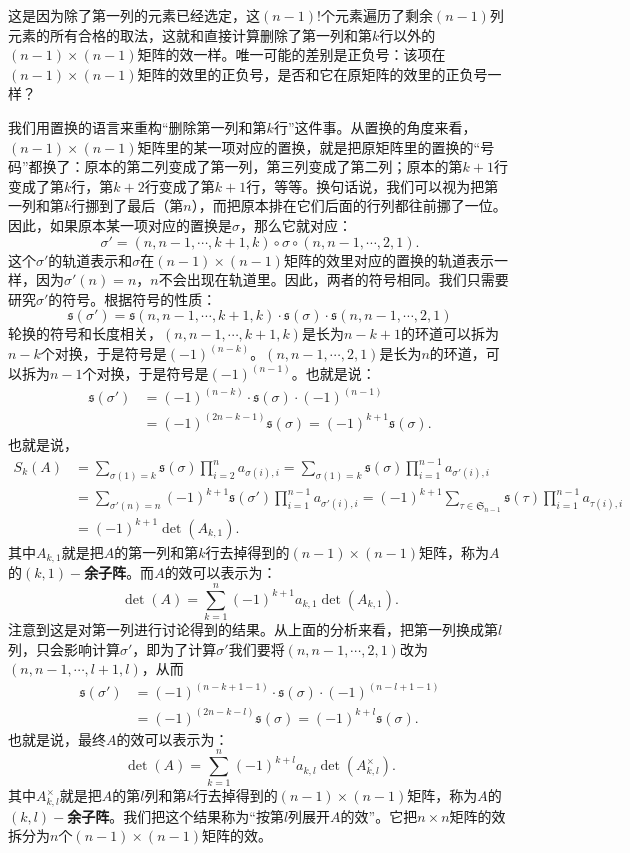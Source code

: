 \documentclass[12pt,UTF8]{ctexbook}
\begin{document}
这是因为除了第一列的元素已经选定，这$(n-1)!$个元素遍历了剩余$(n-1)$列元素的所有合格的取法，这就和直接计算删除了第一列和第$k$行以外的$(n-1)\times (n-1)$矩阵的效一样。唯一可能的差别是正负号：该项在$(n-1)\times (n-1)$矩阵的效里的正负号，是否和它在原矩阵的效里的正负号一样？

我们用置换的语言来重构“删除第一列和第$k$行”这件事。从置换的角度来看，$(n-1)\times (n-1)$矩阵里的某一项对应的置换，就是把原矩阵里的置换的“号码”都换了：原本的第二列变成了第一列，第三列变成了第二列；原本的第$k+1$行变成了第$k$行，第$k+2$行变成了第$k+1$行，等等。换句话说，我们可以视为把第一列和第$k$行挪到了最后（第$n$），而把原本排在它们后面的行列都往前挪了一位。因此，如果原本某一项对应的置换是$\sigma$，那么它就对应：
$$
\sigma' = (n,n-1,\cdots,k+1,k)\circ\sigma \circ(n,n-1,\cdots, 2,1).
$$
这个$\sigma'$的轨道表示和$\sigma$在$(n-1)\times (n-1)$矩阵的效里对应的置换的轨道表示一样，因为$\sigma'(n)=n$，$n$不会出现在轨道里。因此，两者的符号相同。我们只需要研究$\sigma'$的符号。根据符号的性质：
$$
\mathfrak{s} (\sigma') = \mathfrak{s}(n,n-1,\cdots,k+1,k)\cdot \mathfrak{s}(\sigma)\cdot \mathfrak{s}(n,n-1,\cdots, 2,1)
$$
轮换的符号和长度相关，$(n,n-1,\cdots,k+1,k)$是长为$n-k+1$的环道可以拆为$n-k$个对换，于是符号是$(-1)^{(n-k)}$。$(n,n-1,\cdots,2,1)$是长为$n$的环道，可以拆为$n-1$个对换，于是符号是$(-1)^{(n-1)}$。也就是说：
\begin{align*}
    \mathfrak{s} (\sigma') &= (-1)^{(n-k)}\cdot \mathfrak{s}(\sigma) \cdot (-1)^{(n-1)} \\
    &= (-1)^{(2n-k-1)}\mathfrak{s}(\sigma) = (-1)^{k+1}\mathfrak{s}(\sigma).
\end{align*}
也就是说，
\begin{align*}
    S_k(A) &= \sum_{\sigma(1)=k} \mathfrak{s}(\sigma) \prod_{i=2}^n a_{\sigma(i),i} = \sum_{\sigma(1)=k} \mathfrak{s}(\sigma) \prod_{i=1}^{n-1} a_{\sigma'(i),i} \\
    &= \sum_{\sigma'(n)=n} (-1)^{k+1}\mathfrak{s}(\sigma') \prod_{i=1}^{n-1} a_{\sigma'(i),i} = (-1)^{k+1}\sum_{\tau\in\mathfrak{S}_{n-1}} \mathfrak{s}(\tau) \prod_{i=1}^{n-1} a_{\tau(i),i} \\
    &= (-1)^{k+1} \det(A_{k,1}).
\end{align*}
其中$A_{k,1}$就是把$A$的第一列和第$k$行去掉得到的$(n-1)\times (n-1)$矩阵，称为$A$的$(k,1)-$\textbf{余子阵}。而$A$的效可以表示为：
$$
\det(A) = \sum_{k=1}^n (-1)^{k+1} a_{k,1} \det(A_{k,1}).
$$
注意到这是对第一列进行讨论得到的结果。从上面的分析来看，把第一列换成第$l$列，只会影响计算$\sigma'$，即为了计算$\sigma'$我们要将$(n,n-1,\cdots, 2,1)$改为$(n,n-1,\cdots,l+1,l)$，从而
\begin{align*}
    \mathfrak{s} (\sigma') &= (-1)^{(n-k+1-1)}\cdot \mathfrak{s}(\sigma) \cdot (-1)^{(n-l+1-1)} \\
    &= (-1)^{(2n-k-l)}\mathfrak{s}(\sigma) = (-1)^{k+l}\mathfrak{s}(\sigma).
\end{align*}
也就是说，最终$A$的效可以表示为：
$$
\det(A) = \sum_{k=1}^n (-1)^{k+l} a_{k,l} \det(A_{k,l}^{\times}).
$$
其中$A_{k,l}^{\times}$就是把$A$的第$l$列和第$k$行去掉得到的$(n-1)\times (n-1)$矩阵，称为$A$的$(k,l)-$\textbf{余子阵}。我们把这个结果称为“按第$l$列展开$A$的效”。它把$n\times n$矩阵的效拆分为$n$个$(n-1)\times (n-1)$矩阵的效。
\end{document}
